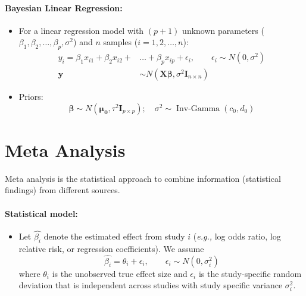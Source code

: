 \documentclass{article}
\begin{document}
\paragraph{Bayesian Linear Regression:}
\begin{itemize}
    \item For a linear regression model with $(p+1)$ unknown parameters ($\beta_1, \beta_2, \ldots, \beta_p, \sigma^2$) and $n$ samples ($i=1,2,\ldots, n$):
        \begin{align}
            y_i=\beta_1x_{i1}+\beta_2x_{i2}+&\ldots+\beta_px_{ip}+\epsilon_i, \qquad \epsilon_i\sim N(0,\sigma^2) \\
            \mathbf{y}&\sim N(\bm{X\beta}, \sigma^2\mathbf{I}_{n\times n})
        \end{align}
    \item Priors:
        \begin{equation}
            \bm{\beta}\sim N(\bm{\mu_0}, \tau^2\mathbf{I}_{p\times p}); \quad \sigma^2\sim \operatorname{Inv-Gamma}(c_0,d_0)
        \end{equation}
\end{itemize}


\section{Meta Analysis}

Meta analysis is the statistical approach to combine information (statistical findings) from different sources.

\paragraph{Statistical model:}
\begin{itemize}
    \item Let $\hat{\beta_i}$ denote the estimated effect from study $i$ (\textit{e.g.,} log odds ratio, log relative risk, or regression coefficients). We assume
        \begin{equation}
            \hat{\beta_i}=\theta_i+\epsilon_i, \qquad \epsilon_i\sim N(0, \sigma^2_i)
        \end{equation}
        where $\theta_i$ is the unobserved true effect size and $\epsilon_i$ is the study-specific random deviation that is independent across studies with study specific variance $\sigma^2_i$.
\end{itemize}
\end{document}

